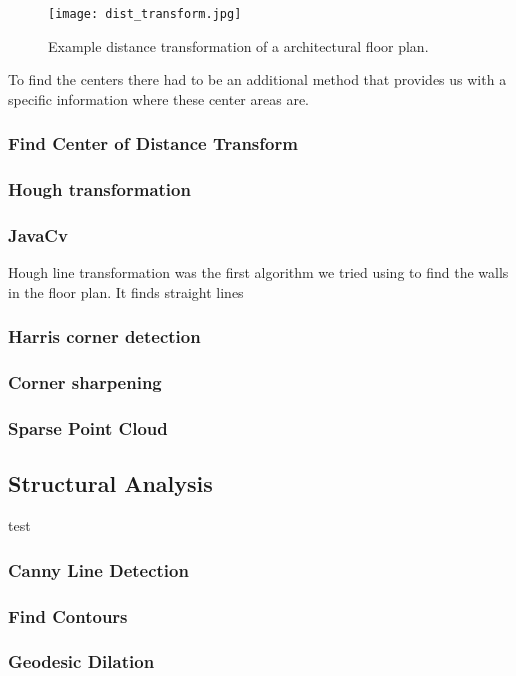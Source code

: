 \begin{figure}[H]
	\centering
	\texttt{[image: dist\_transform.jpg]}
	\caption{Example distance transformation of a architectural floor plan.}
	\label{fig:dist_transform}
\end{figure}

To find the centers there had to be an additional method that provides us with a specific information where these center areas are.
\subsubsection{Find Center of Distance Transform}  
\subsubsection{Hough transformation}
\subsubsection{JavaCv}
Hough line transformation was the first algorithm we tried using to find the walls in the floor plan. It finds straight lines  
\subsubsection{Harris corner detection}
\subsubsection{Corner sharpening}


\subsubsection{Sparse Point Cloud}
\subsection{Structural Analysis}
test
\subsubsection{Canny Line Detection} 
\subsubsection{Find Contours}
\subsubsection{Geodesic Dilation}

